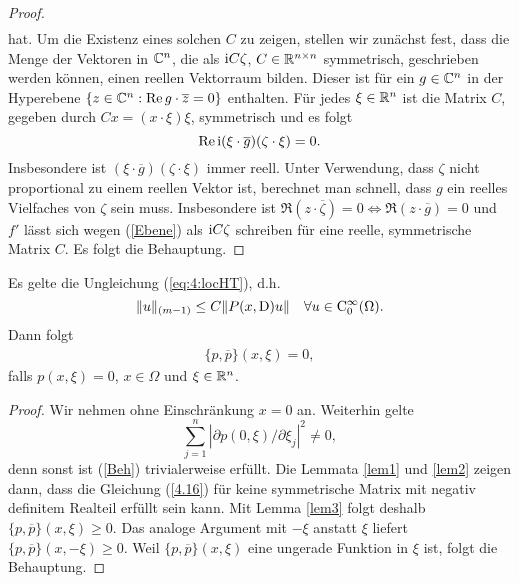 \begin{proof}
\begin{align}
\end{align}
hat. Um die Existenz eines solchen $C$ zu zeigen, stellen wir zunächst fest, dass die Menge der Vektoren in $\mathbb C^n$, die als $\mathrm i C \zeta$, $C \in \mathbb R^{n \times n}$ symmetrisch, geschrieben werden können, einen reellen Vektorraum bilden. Dieser ist für ein $g \in \mathbb C^n$ in der Hyperebene $\{ z \in \mathbb C^n : \operatorname{Re} g\cdot \overline z = 0 \}$ enthalten. Für jedes $\xi \in \mathbb R^n$ ist die Matrix $C$, gegeben durch $C x =  (x\cdot\xi)\xi$, symmetrisch und es folgt
\[
\operatorname{Re} \mathrm i (\xi\cdot\overline g)(\zeta\cdot\xi) = 0.
\]
Insbesondere ist $(\xi\cdot\overline g)(\zeta\cdot\xi) $ immer reell. Unter Verwendung, dass $\zeta$ nicht proportional zu einem reellen Vektor ist, berechnet man schnell, dass $g$ ein reelles Vielfaches von $\zeta$ sein muss. Insbesondere ist $\Re(z\cdot\overline\zeta) = 0 \Leftrightarrow \Re(z\cdot \overline g) = 0$ und $f'$ lässt sich wegen (\ref{Ebene}) als $\mathrm i C \zeta$ schreiben für eine reelle, symmetrische Matrix $C$.  Es folgt die Behauptung.
\end{proof}

\begin{thm}
Es gelte die Ungleichung (\ref{eq:4:locHT}), d.h.
\[
  \| u\|_{(m-1)} \le C \| P(x,\mathrm D) u \| \quad \forall u\in\mathrm C_0^\infty(\Omega).
\]
Dann folgt 
\begin{align}
	\label{Beh}
\{p,\overline p\} (x,\xi) = 0,
\end{align}
falls $p(x,\xi) = 0$, $x \in \Omega$ und $ \xi \in \mathbb R^n$.
\end{thm}
\begin{proof}
Wir nehmen ohne Einschränkung $x=0$ an. Weiterhin gelte
\[
\sum_{j=1}^{n}|\partial p(0,\xi)/\partial \xi_j|^2 \neq 0,
\]
denn sonst ist (\ref{Beh}) trivialerweise erfüllt. Die Lemmata \ref{lem1} und \ref{lem2} zeigen dann, dass die Gleichung (\ref{4.16}) für keine symmetrische Matrix mit negativ definitem Realteil erfüllt sein kann. Mit Lemma \ref{lem3} folgt deshalb $\{p,\overline p\}(x,\xi) \ge 0$. Das analoge Argument mit $-\xi$ anstatt $\xi$ liefert $\{p,\overline p\}(x,-\xi) \ge 0$. Weil $\{p,\overline p\}(x,\xi)$ eine ungerade Funktion in $\xi$ ist, folgt die Behauptung.
\end{proof}